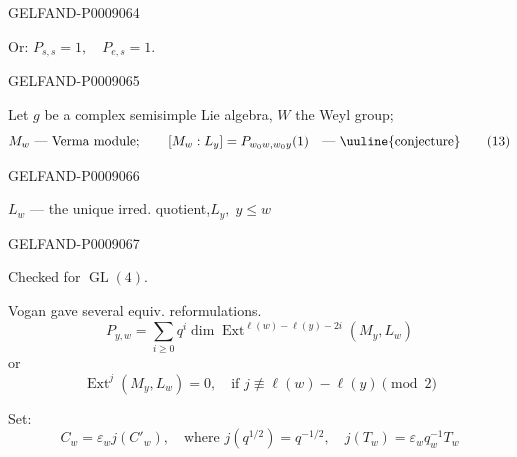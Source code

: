 \begin{GelfandAdjacentEvidence}{GELFAND-P000906}{4}


Or: $P_{s,s}=1,\quad P_{e,s}=1.$
\end{GelfandAdjacentEvidence}
\begin{GelfandAdjacentEvidence}{GELFAND-P000906}{5}


 Let $g$ be a complex semisimple Lie algebra, $W$ the Weyl group;
\begin{equation*}
M_w\text{ --- Verma module};\qquad
[M_w:L_y]=P_{w_0w,w_0y}(1)
\quad\text{--- \uuline{conjecture}}
\tag{13}
\end{equation*}
\end{GelfandAdjacentEvidence}
\begin{GelfandAdjacentEvidence}{GELFAND-P000906}{6}


$L_w$ --- the unique irred. quotient,\qquad $L_y,\;y\le w$
\end{GelfandAdjacentEvidence}
\begin{GelfandAdjacentEvidence}{GELFAND-P000906}{7}


Checked for $\operatorname{GL}(4)$.

Vogan gave several equiv. reformulations.
\begin{equation*}
P_{y,w}=\sum_{i\ge0}q^i\dim\operatorname{Ext}^{\ell(w)-\ell(y)-2i}(M_y,L_w)
\tag{14}
\end{equation*}
or
\begin{equation*}
\operatorname{Ext}^j(M_y,L_w)=0,\quad\text{if }
j\not\equiv\ell(w)-\ell(y)\pmod{2}
\tag{15}
\end{equation*}
\end{GelfandAdjacentEvidence}


Set:
\begin{equation*}
C_w=\varepsilon_wj(C'_w),\quad\text{where }j(q^{1/2})=q^{-1/2},\quad
j(T_w)=\varepsilon_wq_w^{-1}T_w
\tag{16}
\end{equation*}

